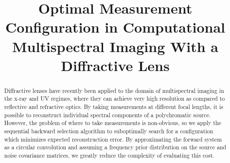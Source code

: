 \documentclass{article}
\title{Optimal Measurement Configuration in Computational \\ Multispectral Imaging With a Diffractive Lens}
\begin{document}
\maketitle

\begin{abstract}

Diffractive lenses have recently been applied to the domain of multispectral
imaging in the x-ray and UV regimes, where they can achieve very high resolution
as compared to reflective and refractive optics. By taking measurements at
different focal lengths, it is possible to reconstruct individual spectral
components of a polychromatic source. However, the problem of where to take
measurements is non-obvious, so we apply the sequential backward selection
algorithm to suboptimally search for a configuration which minimizes expected
reconstruction error. By approximating the forward system as a circular
convolution and assuming a frequency prior distribution on the source and noise
covariance matrices, we greatly reduce the complexity of evaluating this cost.

\end{abstract}
\end{document}

